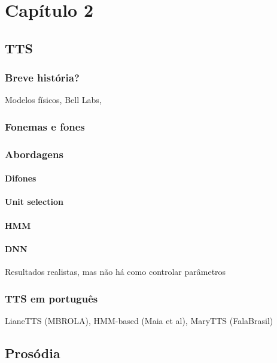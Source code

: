 
\chapter{Capítulo 2}


\section{TTS}
\subsection{Breve história?}
Modelos físicos, Bell Labs, 
\subsection{Fonemas e fones}
\subsection{Abordagens}
\subsubsection{Difones}
\subsubsection{Unit selection}
\subsubsection{HMM}
\subsubsection{DNN}
Resultados realistas, mas não há como controlar parâmetros
\subsection{TTS em português}
LianeTTS (MBROLA), HMM-based (Maia et al), MaryTTS (FalaBrasil)
\section{Prosódia}
